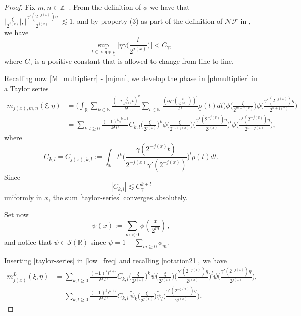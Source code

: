 \documentclass{amsart}
\newcommand{\R}{\mathbb{R}}
\newcommand{\Z}{\mathbb{Z}}
\newcommand{\N}{\mathbb{N}}
\newcommand{\s}{\mathcal{S}}
\newcommand{\NF}{\mathcal{NF}}
\theoremstyle{definition}
\theoremstyle{remark}
\DeclareMathOperator{\supp}{supp}
\numberwithin{equation}{section}
\begin{document}
\begin{proof}
Fix $m,n \in\Z_-$. From the definition of $\phi$ we have that $\big|\frac{\xi}{2^{j(x)}}\big|, \big|\frac{\gamma'(2^{-j(x)})\eta}{2^{j(x)}}\big|\lesssim 1$, and by property (3)  as part of the definition of $\NF$ in \cite{lie2015boundedness}, we have
\[
\sup\limits_{t\in\supp\underline{\rho}}\Big|\eta\gamma\Big(\frac{t}{2^{j(x)}} \Big)\Big|<C_\gamma,
\]
where $C_\gamma$ is a positive constant that is allowed to change from line to line.

Recalling now \eqref{M_multiplierr} - \eqref{mjmn}, we develop the phase in \eqref{phmultiplier} in a Taylor series
\begin{align}
 m_{j(x),m,n}(\xi,\eta)&=\Bigg(\int_\R \sum_{k\in\N} \frac{(-i\frac{\xi}{2^{j(x)}}t)^k}{k!}\sum_{l\in\N}\frac{(i\eta\gamma(\frac{t}{2^{j(x)}}))^l}{l\,!}\underline{\rho}(t)dt\Bigg)\phi\Big(\frac{\xi}{2^{m+j(x)}} \Big)\phi\Big(\frac{\gamma'(2^{-j(x)})\eta}{2^{n+j(x)}}\Big)\nonumber\\
&=\sum_{k,l\ge0}\frac{(-1)^k i^{k+l}}{k!\,l\,!}C_{k,l}
\Big(\frac{\xi}{2^{j(x)}}\Big)^k\phi\Big(\frac{\xi}{2^{m+j(x)}}\Big) \Big(\frac{\gamma'(2^{-j(x)})\eta}{2^{j(x)}}\Big)^l\phi\Big(\frac{\gamma'(2^{-j(x)})\eta}{2^{n+j(x)}}\Big),\label{taylor-series}
\end{align}
where
\[
 C_{k,l}=C_{j(x),k,l}:=\int_\R t^k\Big(\frac{\gamma(2^{-j(x)}t)}{2^{-j(x)}\gamma'(2^{-j(x)})}\Big)^l \underline{\rho}(t)dt.
\]
Since
\begin{equation}\label{constcont}
 |C_{k,l}|\lesssim C_\gamma^{k+l}
\end{equation}
uniformly in $x$, the sum \eqref{taylor-series} converges absolutely.

Set now
\begin{equation}\label{psi}
\psi(x):=\sum_{m<0}\phi(\frac{x}{2^m})\,,
\end{equation}
and notice that $\psi\in\s(\R)$ since $\psi=1-\sum_{m\ge0}\phi_m.$

Inserting \eqref{taylor-series} in \eqref{low_freq} and recalling \eqref{notation21}, we have
\begin{align}
 m^L_{j(x)}(\xi,\eta)&=\sum_{k,l\ge0} \frac{(-1)^k i^{k+l}}{k!\,l\,!}C_{k,l} \Big(\frac{\xi}{2^{j(x)}}\Big)^k\psi\Big(\frac{\xi}{2^{j(x)}}\Big) \Big(\frac{\gamma'(2^{-j(x)})\eta}{2^{j(x)}}\Big)^l
\psi\Big(\frac{\gamma'(2^{-j(x)})\eta}{2^{j(x)}}\Big),\\
&=\sum_{k,l\ge0} \frac{(-1)^k i^{k+l}}{k!\,l\,!}C_{k,l} \,\tilde\psi_k\Big(\frac{\xi}{2^{j(x)}}\Big) \tilde\psi_l\Big(\frac{\gamma'(2^{-j(x)})\eta}{2^{j(x)}}\Big).\label{lowTaylor}
\end{align}




\end{proof}
\end{document}

